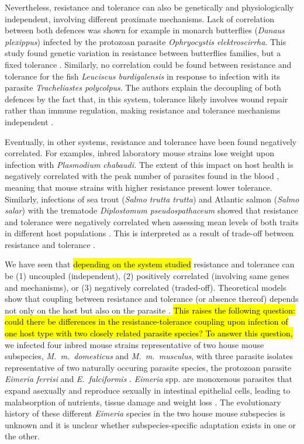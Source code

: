 \documentclass[12pt]{article}
\begin{document}
Nevertheless, resistance and tolerance can also be genetically and physiologically independent, involving different proximate mechanisms. Lack of correlation between both defences was shown for example in monarch butterflies (\textit{Danaus plexippus}) infected by the protozoan parasite \textit{Ophryocystis elektroscirrha}. This study found genetic variation in resistance between butterflies families, but a fixed tolerance \citep{Lefvre2010}. Similarly, no correlation could be found between resistance and tolerance for the fish \textit{Leuciscus burdigalensis} in response to infection with its parasite \textit{Tracheliastes polycolpus}. The authors explain the decoupling of both defences by the fact that, in this system, tolerance likely involves wound repair rather than immune regulation, making resistance and tolerance mechanisms independent \citep{MazGuilmo2014}.\par

Eventually, in other systems, resistance and tolerance have been found negatively correlated. For examples, inbred laboratory mouse strains lose weight upon infection with \textit{Plasmodium chabaudi.} The extent of this impact on host health is negatively correlated with the peak number of parasites found in the blood \citep{raaberg_disentangling_2007}, meaning that mouse strains with higher resistance present lower tolerance. Similarly, infections of sea trout (\textit{Salmo trutta trutta}) and Atlantic salmon (\textit{Salmo salar}) with the trematode \textit{Diplostomum pseudospathaceum} showed that resistance and tolerance were negatively correlated when assessing mean levels of both traits in different host populations \citep{klemme_vertebrate_2016}. This is interpreted as a result of trade-off between resistance and tolerance \citep{sheldon_ecological_1996, restif_concurrent_2004, raaberg_decomposing_2009}.\par

We have seen that \hl{depending on the system studied} resistance and tolerance can be (1) uncoupled (independent), (2) positively correlated (involving same genes and mechanisms), or (3) negatively correlated (traded-off). Theoretical models show that coupling between resistance and tolerance (or absence thereof) depends not only on the host but also on the parasite \citep{Carval2010}. \hl{This raises the following question: could there be differences in the resistance-tolerance coupling upon infection of one host type with two closely related parasite species? To answer this question,} we infected four inbred mouse strains representative of two house mouse subspecies, \textit{M.~m.~domesticus} and \textit{M.~m.~musculus}, with three parasite isolates representative of two naturally occuring parasite species, the protozoan parasite \textit{Eimeria ferrisi} and \textit{E.~falciformis }\citep{jarquin-diaz_detection_2019}. \textit{Eimeria }spp. are monoxenous parasites that expand asexually and reproduce sexually in intestinal epithelial cells, leading to malabsorption of nutrients, tissue damage and weight loss \citep{chapman_chapter_2013}. The evolutionary history of these different \textit{Eimeria} species in the two house mouse subspecies is unknown and it is unclear whether subspecies-specific adaptation exists in one or the other. 
\end{document}
